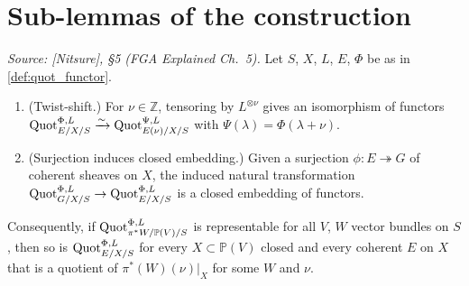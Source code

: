 \section{Sub-lemmas of the construction}
\label{sec:quot_sub_lemmas}

\begin{lemma}
  \label{lem:quot_reduction_to_pi_star_W}

  \textit{Source: [Nitsure], \S 5 (FGA Explained Ch.~5).}
  Let \(S\), \(X\), \(L\), \(E\), \(\Phi\) be as in \cref{def:quot_functor}.
  \begin{enumerate}
    \item (Twist-shift.) For \(\nu \in \mathbb{Z}\), tensoring by
      \(L^{\otimes \nu}\) gives an isomorphism of functors
      \(\operatorname{Quot}^{\Phi,L}_{E/X/S} \xrightarrow{\sim}
      \operatorname{Quot}^{\Psi,L}_{E(\nu)/X/S}\) with \(\Psi(\lambda) = \Phi(\lambda + \nu)\).
    \item (Surjection induces closed embedding.) Given a surjection
      \(\phi : E \twoheadrightarrow G\) of coherent sheaves on \(X\), the
      induced natural transformation
      \(\operatorname{Quot}^{\Phi,L}_{G/X/S} \to \operatorname{Quot}^{\Phi,L}_{E/X/S}\) is a closed
      embedding of functors.
  \end{enumerate}
  Consequently, if \(\operatorname{Quot}^{\Phi,L}_{\pi^* W / \mathbb{P}(V)/S}\) is
  representable for all \(V\), \(W\) vector bundles on \(S\), then so is
  \(\operatorname{Quot}^{\Phi,L}_{E/X/S}\) for every \(X \subset \mathbb{P}(V)\) closed and
  every coherent \(E\) on \(X\) that is a quotient of \(\pi^*(W)(\nu)|_X\) for
  some \(W\) and \(\nu\).
\end{lemma}

